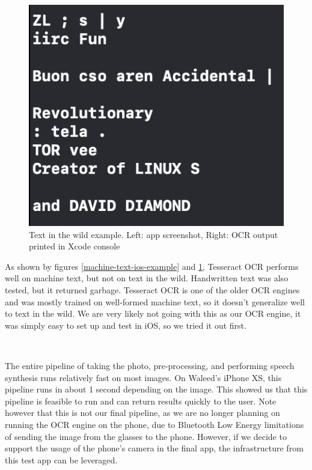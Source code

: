 \documentclass[a4paper,11pt]{article}
\begin{document}
\begin{figure}[H]
    \includegraphics[width={0.5\linewidth}]{img/ios_test_app/testapp_bookcover_output.png}
    \caption{Text in the wild example. Left: app screenshot, Right: OCR output printed in Xcode console}
    \label{text-in-the-wild-ios-example}
\end{figure}

\noindent
As shown by figures \ref{machine-text-ios-example} and \ref{text-in-the-wild-ios-example}, Tesseract OCR performs well on machine text, but not on text in the wild. Handwritten text was also tested, but it returned garbage. Tesseract OCR is one of the older OCR engines and was mostly trained on well-formed machine text, so it doesn't generalize well to text in the wild. We are very likely not going with this as our OCR engine, it was simply easy to set up and test in iOS, so we tried it out first.

\ 

\noindent
The entire pipeline of taking the photo, pre-processing, and performing speech synthesis runs relatively fast on most images. On Waleed's iPhone XS, this pipeline runs in about 1 second depending on the image. This showed us that this pipeline is feasible to run and can return results quickly to the user. Note however that this is not our final pipeline, as we are no longer planning on running the OCR engine on the phone, due to Bluetooth Low Energy limitations of sending the image from the glasses to the phone. However, if we decide to support the usage of the phone's camera in the final app, the infrastructure from this test app can be leveraged.

\
\end{document}
